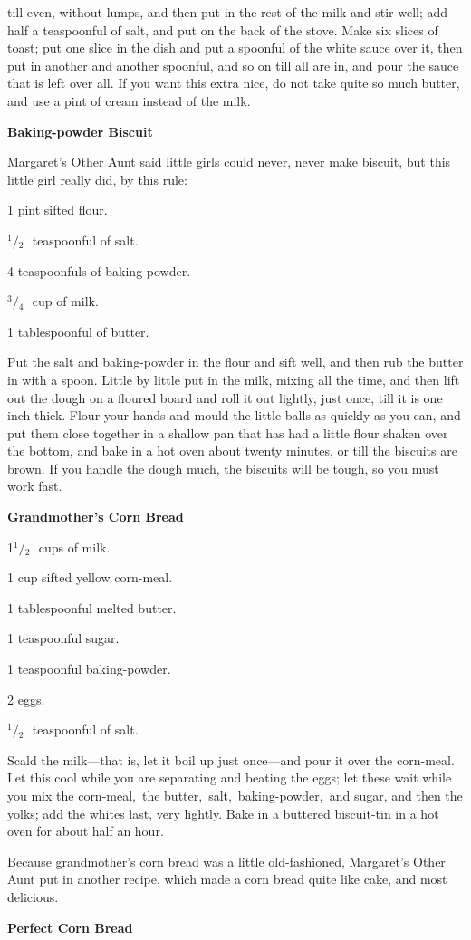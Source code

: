 \documentclass[11pt]{book}
\newcommand{\indpar}{\par\noindent\hspace*{\parindent}}
\newcommand{\ingredient}{\indpar}
\newcommand{\instruction}{\indpar}
\newcommand{\OneHalf}{\ensuremath{{}^1\!\!/\!{}_2\mbox{\ }}}
\newcommand{\ThreeQuarters}{\ensuremath{{}^3\!\!/\!{}_4\mbox{\ }}}
\newenvironment{RecipeTitle}{\medskip\begin{center}\large\bf }{\end{center}\smallskip}
\begin{document}
till even, without lumps, and then put in the rest of the milk
and stir well; add half a teaspoonful of salt, and put on the
back of the stove.  Make six slices of toast; put one slice in
the dish and put a spoonful of the white sauce over it, then
put in another and another spoonful, and so on till all are in,
and pour the sauce that is left over all.  If you want this
extra nice, do not take quite so much butter, and use a pint of
cream instead of the milk.
\begin{RecipeTitle}
Baking-powder Biscuit\label{baking_powder_biscuit}
\end{RecipeTitle}
\instruction
  Margaret's Other Aunt said little girls could never, never
make biscuit, but this little girl really did, by this rule:
\ingredient  1 pint sifted flour.
\ingredient  \OneHalf teaspoonful of salt.
\ingredient  4 teaspoonfuls of baking-powder.
\ingredient  \ThreeQuarters cup of milk.
\ingredient  1 tablespoonful of butter.
\instruction
  Put the salt and baking-powder in the flour and sift well,
and then rub the butter in with a spoon.  Little by little put
in the milk, mixing all the time, and then lift out the dough
on a floured board and roll it out lightly, just once, till
it is one inch thick.  Flour your hands and mould the little
balls as quickly as you can, and put them close together in a
shallow pan that has had a little flour shaken over the bottom,
and bake in a hot oven about twenty minutes, or till the
biscuits are brown.  If you handle the dough much, the biscuits
will be tough, so you must work fast.
\begin{RecipeTitle}
Grandmother's Corn Bread\label{grandmothers_cornbread}
\end{RecipeTitle}
\ingredient  1\OneHalf cups of milk.
\ingredient  1 cup sifted yellow corn-meal.
\ingredient  1 tablespoonful melted butter.
\ingredient  1 teaspoonful sugar.
\ingredient  1 teaspoonful baking-powder.
\ingredient  2 eggs.
\ingredient  \OneHalf teaspoonful of salt.
\instruction
  Scald the milk---that is, let it boil up just once---and
pour it over the corn-meal.  Let this cool while you
are separating and beating the eggs;  let these wait while
you mix the corn-meal,\, the butter,\, salt,\, baking-powder,\, and
sugar, and then the yolks; add the whites last, very lightly.
Bake in a buttered biscuit-tin in a hot oven for about half
an hour.
\smallskip\indpar
  Because grandmother's corn bread was a little old-fashioned,
Margaret's Other Aunt put in another recipe, which made a corn
bread quite like cake, and most delicious.
\begin{RecipeTitle}
Perfect Corn Bread\label{perfect_cornbread}
\end{RecipeTitle}
\end{document}
